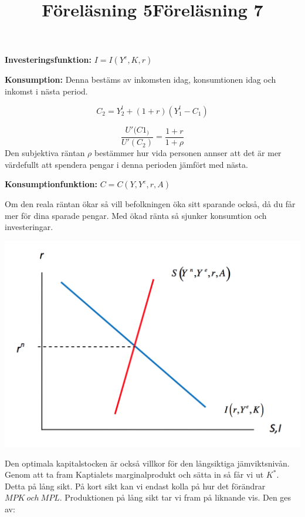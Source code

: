 \documentclass{article}
\begin{document}
\textbf{Investeringsfunktion:} $I = I(Y^e,K,r)$

\vspace{5mm}
\title{Föreläsning 5}
\vspace{5mm}
\par \noindent

\textbf{Konsumption:} Denna bestäms av inkomsten idag, konsumtionen idag och inkomst i nästa period. 

$$
C_2 = Y^l_2 + (1+r)(Y^l_1-C_1)
$$

$$
\frac{U'(C1_)}{U'(C_2)} = \frac{1+r}{1+\rho}
$$
Den subjektiva räntan $ \rho $ bestämmer hur vida personen annser att det är mer värdefullt att spendera pengar i denna perioden jämfört med nästa. 

\textbf{Konsumptionfunktion:} $ C = C(Y,Y^e,r,A)$

Om den reala räntan ökar så vill befolkningen öka sitt sparande också, då du får mer för dina sparade pengar. Med ökad ränta så sjunker konsumtion och investeringar. 

\includegraphics[scale=0.4]{skarm2}

\vspace{5mm}
\title{Föreläsning 7}
\vspace{5mm}
\par \noindent

Den optimala kapitalstocken är också villkor för den långsiktiga jämviktsnivån. 
Genom att ta fram Kaptialets marginalprodukt och sätta in så får vi ut $K^*$.  Detta på lång sikt. På kort sikt kan vi endast kolla på hur det förändrar $MPK \ och \ MPL$. 
Produktionen på lång sikt tar vi fram på liknande vis. Den ges av: 
\end{document}
